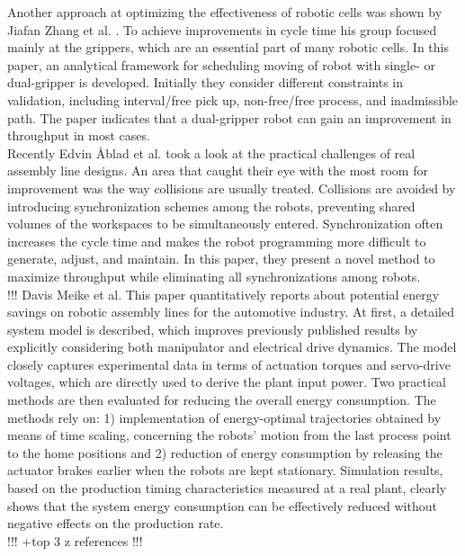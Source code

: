 Another approach at optimizing the effectiveness of robotic cells was shown by Jiafan Zhang et al. \cite{OptimizationCycleTimeZhang}. To achieve improvements in cycle time his group focused mainly at the grippers, which are an essential part of many robotic cells. In this paper, an analytical framework for scheduling moving of robot with single- or dual-gripper is developed. Initially they consider different constraints in validation, including interval/free pick up, non-free/free process, and inadmissible path. The paper indicates that a dual-gripper robot can gain an improvement in throughput in most cases. \\

Recently Edvin Åblad et al. \cite{CollisionAvoidanceAblad} took a look at the practical challenges of real assembly line designs. An area that caught their eye with the most room for improvement was the way collisions are usually treated. Collisions are avoided by introducing synchronization schemes among the robots, preventing shared volumes of the workspaces to be simultaneously entered. Synchronization often increases the cycle time and makes the robot programming more difficult to generate, adjust, and maintain. In this paper, they present a novel method to maximize throughput while eliminating all synchronizations among robots. \\

!!!
Davis Meike et al. \cite{Meike8Percent}
This paper quantitatively reports about potential energy savings on robotic assembly lines for the automotive industry. At first, a detailed system model is described, which improves previously published results by explicitly considering both manipulator and electrical drive dynamics. The model closely captures experimental data in terms of actuation torques and servo-drive voltages, which are directly used to derive the plant input power. Two practical methods are then evaluated for reducing the overall energy consumption. The methods rely on: 1) implementation of energy-optimal trajectories obtained by means of time scaling, concerning the robots' motion from the last process point to the home positions and 2) reduction of energy consumption by releasing the actuator brakes earlier when the robots are kept stationary. Simulation results, based on the production timing characteristics measured at a real plant, clearly shows that the system energy consumption can be effectively reduced without negative effects on the production rate. \\
!!!
+top 3 z references
!!!

